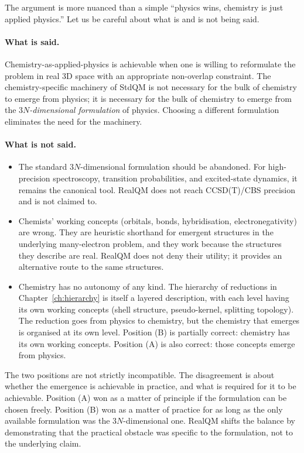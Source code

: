 The argument is more nuanced than a simple ``physics wins, chemistry is just applied physics.'' Let us be careful about what is and is not being said.

\paragraph{What is said.}
Chemistry-as-applied-physics is achievable when one is willing to reformulate the problem in real 3D space with an appropriate non-overlap constraint. The chemistry-specific machinery of StdQM is not necessary for the bulk of chemistry to emerge from physics; it is necessary for the bulk of chemistry to emerge from the \emph{$3N$-dimensional formulation} of physics. Choosing a different formulation eliminates the need for the machinery.

\paragraph{What is not said.}
\begin{itemize}
\item The standard $3N$-dimensional formulation should be abandoned. For high-precision spectroscopy, transition probabilities, and excited-state dynamics, it remains the canonical tool. RealQM does not reach CCSD(T)/CBS precision and is not claimed to.
\item Chemists' working concepts (orbitals, bonds, hybridisation, electronegativity) are wrong. They are heuristic shorthand for emergent structures in the underlying many-electron problem, and they work because the structures they describe are real. RealQM does not deny their utility; it provides an alternative route to the same structures.
\item Chemistry has no autonomy of any kind. The hierarchy of reductions in Chapter~\ref{ch:hierarchy} is itself a layered description, with each level having its own working concepts (shell structure, pseudo-kernel, splitting topology). The reduction goes from physics to chemistry, but the chemistry that emerges is organised at its own level. Position (B) is partially correct: chemistry has its own working concepts. Position (A) is also correct: those concepts emerge from physics.
\end{itemize}

The two positions are not strictly incompatible. The disagreement is about whether the emergence is achievable in practice, and what is required for it to be achievable. Position (A) won as a matter of principle if the formulation can be chosen freely. Position (B) won as a matter of practice for as long as the only available formulation was the $3N$-dimensional one. RealQM shifts the balance by demonstrating that the practical obstacle was specific to the formulation, not to the underlying claim.


